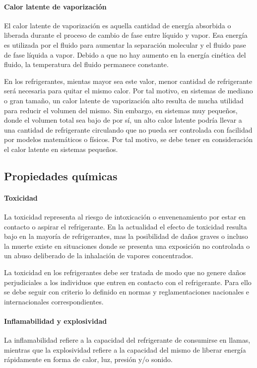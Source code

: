 	\paragraph{Calor latente de vaporización} El calor latente de vaporización es aquella cantidad de energía absorbida o liberada durante el proceso de cambio de fase entre líquido y vapor. Esa energía es utilizada por el fluido para aumentar la separación molecular y el fluido pase de fase líquida a vapor. Debido a que no hay aumento en la energía cinética del fluido, la temperatura del fluido permanece constante.

	En los refrigerantes, mientas mayor sea este valor, menor cantidad de refrigerante será necesaria para quitar el mismo calor. Por tal motivo, en sistemas de mediano o gran tamaño, un calor latente de vaporización alto resulta de mucha utilidad para reducir el volumen del mismo. Sin embargo, en sistemas muy pequeños, donde el volumen total sea bajo de por sí, un alto calor latente podría llevar a una cantidad de refrigerante circulando que no pueda ser controlada con facilidad por modelos matemáticos o físicos. Por tal motivo, se debe tener en consideración el calor latente en sistemas pequeños.

	\subsection{Propiedades químicas}

	\paragraph{Toxicidad} La toxicidad representa al riesgo de intoxicación o envenenamiento por estar en contacto o aspirar el refrigerante. En la actualidad el efecto de toxicidad resulta bajo en la mayoría de refrigerantes, mas la posibilidad de daños graves o incluso la muerte existe en situaciones donde se presenta una exposición no controlada o un abuso deliberado de la inhalación de vapores concentrados. 
	
	La toxicidad en los refrigerantes debe ser tratada de modo que no genere daños perjudiciales a los individuos que entren en contacto con el refrigerante. Para ello se debe seguir con criterio lo definido en normas y reglamentaciones nacionales e internacionales correspondientes. 

	\paragraph{Inflamabilidad y explosividad} La inflamabilidad refiere a la capacidad del refrigerante de consumirse en llamas, mientras que la explosividad refiere a la capacidad del mismo de liberar energía rápidamente en forma de calor, luz, presión y/o sonido.
	
